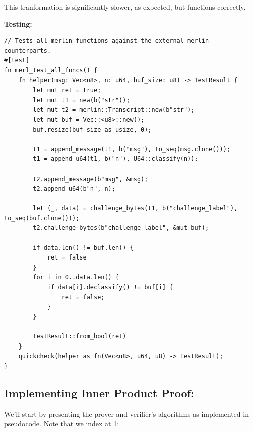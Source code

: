 \documentclass{article}
\begin{document}
This tranformation is significantly slower, as expected, but functions
correctly.

\textbf{Testing:}

\begin{lstlisting}
// Tests all merlin functions against the external merlin counterparts.
#[test]
fn merl_test_all_funcs() {
	fn helper(msg: Vec<u8>, n: u64, buf_size: u8) -> TestResult {
		let mut ret = true;
		let mut t1 = new(b("str"));
		let mut t2 = merlin::Transcript::new(b"str");
		let mut buf = Vec::<u8>::new();
		buf.resize(buf_size as usize, 0);

		t1 = append_message(t1, b("msg"), to_seq(msg.clone()));
		t1 = append_u64(t1, b("n"), U64::classify(n));

		t2.append_message(b"msg", &msg);
		t2.append_u64(b"n", n);

		let (_, data) = challenge_bytes(t1, b("challenge_label"), to_seq(buf.clone()));
		t2.challenge_bytes(b"challenge_label", &mut buf);

		if data.len() != buf.len() {
			ret = false
		}
		for i in 0..data.len() {
			if data[i].declassify() != buf[i] {
				ret = false;
			}
		}

		TestResult::from_bool(ret)
	}
	quickcheck(helper as fn(Vec<u8>, u64, u8) -> TestResult);
}
\end{lstlisting}

\subsection{Implementing Inner Product Proof:}

We'll start by presenting the prover and verifier's algorithms as
implemented in pseudocode. Note that we index at 1:
\end{document}
